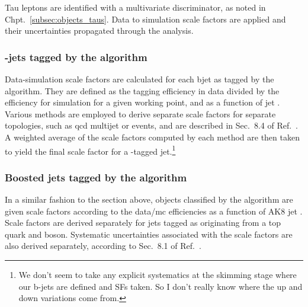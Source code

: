 Tau leptons are identified with a multivariate discriminator, as noted in Chpt.~\ref{subsec:objects_taus}. Data to simulation scale factors are applied and their uncertainties propagated through the analysis.





\subsubsection{\texorpdfstring{\Pbottom-jets}{b-jets} tagged by the \texorpdfstring{\deepcsv}{DeepCSV} algorithm}
\label{subsubsec:htoinv_btagging_sfs}

Data-simulation scale factors are calculated for each \gls{bjet} as tagged by the \deepcsv algorithm. They are defined as the tagging efficiency in data divided by the efficiency for simulation for a given working point, and as a function of \gls{jet} \pt. Various methods are employed to derive separate scale factors for separate topologies, such as \acrshort{qcd} multijet or \ttbar events, and are described in Sec.~8.4 of Ref.~. A weighted average of the scale factors computed by each method are then taken to yield the final scale factor for a \Pbottom-tagged \gls{jet}.\footnote{We don't seem to take any explicit systematics at the skimming stage where our b-jets are defined and SFs taken. So I don't really know where the up and down variations come from.}





\subsubsection{Boosted jets tagged by the \texorpdfstring{\deepakeight}{DeepAK8} algorithm}
\label{subsubsec:htoinv_deepak8_sfs}

In a similar fashion to the section above, objects classified by the \deepakeight algorithm are given scale factors according to the data/\acrshort{mc} efficiencies as a function of AK8 \gls{jet} \pt. Scale factors are derived separately for \glspl{jet} tagged as originating from a top quark and \PVec boson. Systematic uncertainties associated with the scale factors are also derived separately, according to Sec.~8.1 of Ref.~.


